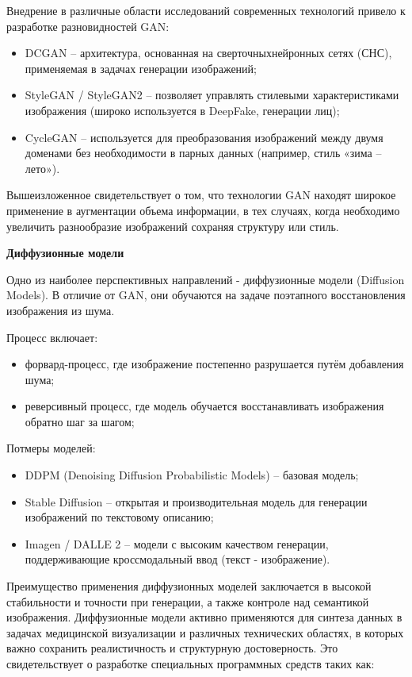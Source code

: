 Внедрение в различные области исследований современных технологий привело к разработке разновидностей GAN:
\begin{itemize}
	\item DCGAN – архитектура, основанная на сверточныхнейронных сетях (СНС), применяемая в задачах генерации изображений;
	\item StyleGAN / StyleGAN2 – позволяет управлять стилевыми характеристиками изображения (широко используется в DeepFake, генерации лиц);
	\item CycleGAN – используется для преобразования изображений между двумя доменами без необходимости в парных данных (например, стиль «зима – лето»).
\end{itemize}

Вышеизложенное свидетельствует о том, что технологии GAN находят широкое применение в аугментации объема информации, в тех случаях, когда необходимо увеличить разнообразие изображений сохраняя структуру или стиль.

\textbf{Диффузионные модели}

Одно из наиболее перспективных направлений	 - диффузионные модели (Diffusion Models). В отличие от GAN, они обучаются на задаче поэтапного восстановления изображения из шума.

Процесс включает:

\begin{itemize}
	\item форвард-процесс, где изображение постепенно разрушается путём добавления шума;
	\item реверсивный процесс, где модель обучается восстанавливать изображения обратно шаг за шагом;
\end{itemize}
Потмеры моделей:

\begin{itemize}
	\item DDPM (Denoising Diffusion Probabilistic Models) – базовая модель;
	\item Stable Diffusion – открытая и производительная модель для генерации изображений по текстовому описанию;
	\item Imagen / DALLE 2 – модели с высоким качеством генерации, поддерживающие кроссмодальный ввод (текст - изображение).
\end{itemize}

Преимущество применения диффузионных моделей заключается в высокой стабильности и точности при генерации, а также контроле над семантикой изображения. Диффузионные модели активно применяются для синтеза данных в задачах медицинской визуализации и различных технических областях, в которых важно сохранить реалистичность и структурную достоверность. Это свидетельствует о разработке специальных программных средств таких как:

